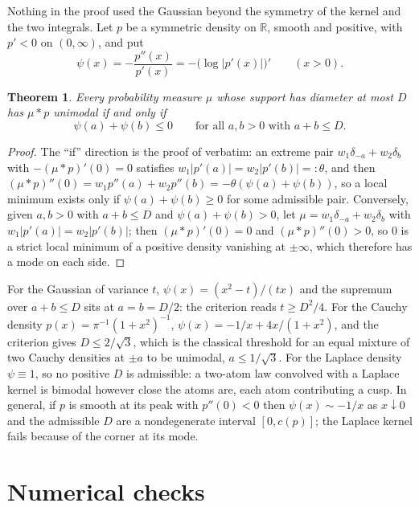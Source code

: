\documentclass[11pt]{amsart}
\newtheorem{theorem}{Theorem}[section]
\theoremstyle{definition}
\newcommand{\R}{\mathbb{R}}
\begin{document}
Nothing in the proof used the Gaussian beyond the symmetry of the kernel and the two integrals. Let $p$ be a symmetric density on $\R$, smooth and positive, with $p'<0$ on $(0,\infty)$, and put
\[
\psi(x)=-\frac{p''(x)}{p'(x)}=-\big(\log|p'(x)|\big)'\qquad(x>0).
\]

\begin{theorem}\label{thm:kernel}
Every probability measure $\mu$ whose support has diameter at most $D$ has $\mu*p$ unimodal if and only if
\[
\psi(a)+\psi(b)\le0\qquad\text{for all }a,b>0\text{ with }a+b\le D.
\]
\end{theorem}

\begin{proof}
The ``if'' direction is the proof of  verbatim: an extreme pair $w_1\delta_{-a}+w_2\delta_b$ with $-(\mu*p)'(0)=0$ satisfies $w_1|p'(a)|=w_2|p'(b)|=:\theta$, and then $(\mu*p)''(0)=w_1p''(a)+w_2p''(b)=-\theta(\psi(a)+\psi(b))$, so a local minimum exists only if $\psi(a)+\psi(b)\ge0$ for some admissible pair. Conversely, given $a,b>0$ with $a+b\le D$ and $\psi(a)+\psi(b)>0$, let $\mu=w_1\delta_{-a}+w_2\delta_b$ with $w_1|p'(a)|=w_2|p'(b)|$; then $(\mu*p)'(0)=0$ and $(\mu*p)''(0)>0$, so $0$ is a strict local minimum of a positive density vanishing at $\pm\infty$, which therefore has a mode on each side.
\end{proof}

For the Gaussian of variance $t$, $\psi(x)=(x^2-t)/(tx)$ and the supremum over $a+b\le D$ sits at $a=b=D/2$: the criterion reads $t\ge D^2/4$. For the Cauchy density $p(x)=\pi^{-1}(1+x^2)^{-1}$, $\psi(x)=-1/x+4x/(1+x^2)$, and the criterion gives $D\le2/\sqrt3$, which is the classical threshold for an equal mixture of two Cauchy densities at $\pm a$ to be unimodal, $a\le1/\sqrt3$. For the Laplace density $\psi\equiv1$, so no positive $D$ is admissible: a two-atom law convolved with a Laplace kernel is bimodal however close the atoms are, each atom contributing a cusp. In general, if $p$ is smooth at its peak with $p''(0)<0$ then $\psi(x)\sim-1/x$ as $x\downarrow0$ and the admissible $D$ are a nondegenerate interval $[0,c(p)]$; the Laplace kernel fails because of the corner at its mode.

\section{Numerical checks}\label{sec:numerics}
\end{document}
